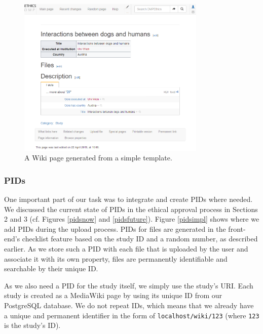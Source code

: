 \documentclass[10pt]{article}
\begin{document}
\begin{figure}
\centering

	\includegraphics[width=0.8\textwidth]{img/template.png}
	\caption{A Wiki page generated from a simple template.}
	\label{fig:template}
\end{figure}


\subsubsection{PIDs}
One important part of our task was to integrate and create PIDs where needed. We discussed the current state of PIDs in the ethical approval process in Sections 2 and 3 (cf. Figures \ref{pidsnow} and \ref{pidsfuture}). Figure \ref{pidsimpl} shows where we add PIDs during the upload process. PIDs for files are generated in the front-end's checklist feature based on the study ID and a random number, as described earlier. As we store such a PID with each file that is uploaded by the user and associate it with its own property, files are permanently identifiable and searchable by their unique ID.

As we also need a PID for the study itself, we simply use the study's URI. Each study is created as a MediaWiki page by using its unique ID from our PostgreSQL database. We do not repeat IDs, which means that we already have a unique and permanent identifier in the form of \texttt{localhost/wiki/123} (where \texttt{123} is the study's ID).
\end{document}
